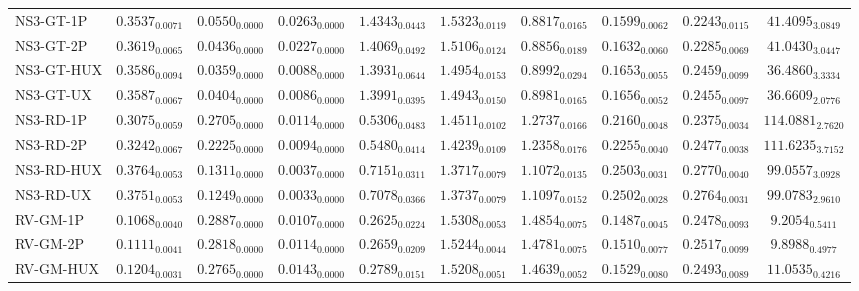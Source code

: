 \begin{longtable}{@{}lccccccccc@{}}
NS3-GT-1P & $0.3537_{0.0071}$ & $0.0550_{0.0000}$ & $0.0263_{0.0000}$ & $1.4343_{0.0443}$ & $1.5323_{0.0119}$ & $0.8817_{0.0165}$ & $0.1599_{0.0062}$ & $0.2243_{0.0115}$ & $41.4095_{3.0849}$ \\
NS3-GT-2P & $0.3619_{0.0065}$ & $0.0436_{0.0000}$ & $0.0227_{0.0000}$ & $1.4069_{0.0492}$ & $1.5106_{0.0124}$ & $0.8856_{0.0189}$ & $0.1632_{0.0060}$ & $0.2285_{0.0069}$ & $41.0430_{3.0447}$ \\
NS3-GT-HUX & $0.3586_{0.0094}$ & $\mathbf{0.0359}_{0.0000}$ & $0.0088_{0.0000}$ & $1.3931_{0.0644}$ & $1.4954_{0.0153}$ & $0.8992_{0.0294}$ & $0.1653_{0.0055}$ & $0.2459_{0.0099}$ & $36.4860_{3.3334}$ \\
NS3-GT-UX & $0.3587_{0.0067}$ & $0.0404_{0.0000}$ & $0.0086_{0.0000}$ & $1.3991_{0.0395}$ & $1.4943_{0.0150}$ & $0.8981_{0.0165}$ & $0.1656_{0.0052}$ & $0.2455_{0.0097}$ & $36.6609_{2.0776}$ \\
NS3-RD-1P & $0.3075_{0.0059}$ & $0.2705_{0.0000}$ & $0.0114_{0.0000}$ & $0.5306_{0.0483}$ & $1.4511_{0.0102}$ & $1.2737_{0.0166}$ & $0.2160_{0.0048}$ & $0.2375_{0.0034}$ & $\mathbf{114.0881}_{2.7620}$ \\
NS3-RD-2P & $0.3242_{0.0067}$ & $0.2225_{0.0000}$ & $0.0094_{0.0000}$ & $0.5480_{0.0414}$ & $1.4239_{0.0109}$ & $1.2358_{0.0176}$ & $0.2255_{0.0040}$ & $0.2477_{0.0038}$ & $111.6235_{3.7152}$ \\
NS3-RD-HUX & $0.3764_{0.0053}$ & $0.1311_{0.0000}$ & $0.0037_{0.0000}$ & $0.7151_{0.0311}$ & $\mathbf{1.3717}_{0.0079}$ & $1.1072_{0.0135}$ & $\mathbf{0.2503}_{0.0031}$ & $0.2770_{0.0040}$ & $99.0557_{3.0928}$ \\
NS3-RD-UX & $0.3751_{0.0053}$ & $0.1249_{0.0000}$ & $0.0033_{0.0000}$ & $0.7078_{0.0366}$ & $\mathbf{1.3737}_{0.0079}$ & $1.1097_{0.0152}$ & $\mathbf{0.2502}_{0.0028}$ & $0.2764_{0.0031}$ & $99.0783_{2.9610}$ \\
RV-GM-1P & $0.1068_{0.0040}$ & $0.2887_{0.0000}$ & $0.0107_{0.0000}$ & $0.2625_{0.0224}$ & $1.5308_{0.0053}$ & $1.4854_{0.0075}$ & $0.1487_{0.0045}$ & $0.2478_{0.0093}$ & $9.2054_{0.5411}$ \\
RV-GM-2P & $0.1111_{0.0041}$ & $0.2818_{0.0000}$ & $0.0114_{0.0000}$ & $0.2659_{0.0209}$ & $1.5244_{0.0044}$ & $1.4781_{0.0075}$ & $0.1510_{0.0077}$ & $0.2517_{0.0099}$ & $9.8988_{0.4977}$ \\
RV-GM-HUX & $0.1204_{0.0031}$ & $0.2765_{0.0000}$ & $0.0143_{0.0000}$ & $0.2789_{0.0151}$ & $1.5208_{0.0051}$ & $1.4639_{0.0052}$ & $0.1529_{0.0080}$ & $0.2493_{0.0089}$ & $11.0535_{0.4216}$ \\

\end{longtable}
